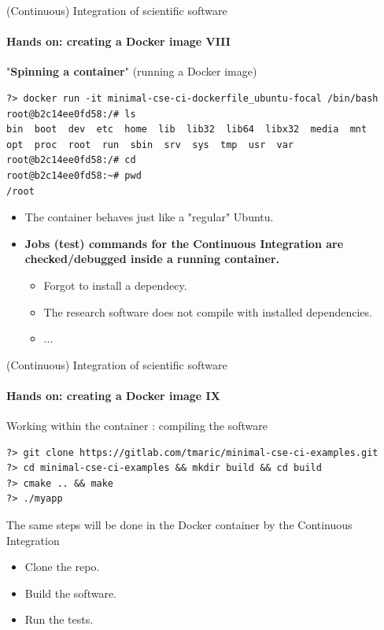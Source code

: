\begin{frame}[fragile]{(Continuous) Integration of scientific software} 
    \framesubtitle{Hands on: creating a Docker image VIII} 
    \vfill

    "\textbf{Spinning a container}" (running a Docker image) 

    \begin{verbatim}
?> docker run -it minimal-cse-ci-dockerfile_ubuntu-focal /bin/bash
root@b2c14ee0fd58:/# ls
bin  boot  dev  etc  home  lib  lib32  lib64  libx32  media  mnt  
opt  proc  root  run  sbin  srv  sys  tmp  usr  var
root@b2c14ee0fd58:/# cd 
root@b2c14ee0fd58:~# pwd
/root
    \end{verbatim}

    \begin{itemize}
        \item The container behaves just like a "regular" Ubuntu. 
        \item \textbf{Jobs (test) commands for the Continuous Integration are checked/debugged inside a running container.}
            \begin{itemize}
                \item Forgot to install a dependecy.
                \item The research software does not compile with installed dependencies.
                \item ...
            \end{itemize}
    \end{itemize}

\end{frame}


\begin{frame}[fragile]{(Continuous) Integration of scientific software} 
    \framesubtitle{Hands on: creating a Docker image IX} 
    \vfill

    Working within the container : compiling the software

    \begin{verbatim}
?> git clone https://gitlab.com/tmaric/minimal-cse-ci-examples.git
?> cd minimal-cse-ci-examples && mkdir build && cd build
?> cmake .. && make
?> ./myapp
    \end{verbatim}

    The same steps will be done in the Docker container by the Continuous Integration  
    \begin{itemize}
        \item Clone the repo. 
        \item Build the software.  
        \item Run the tests. 
    \end{itemize}

\end{frame}


